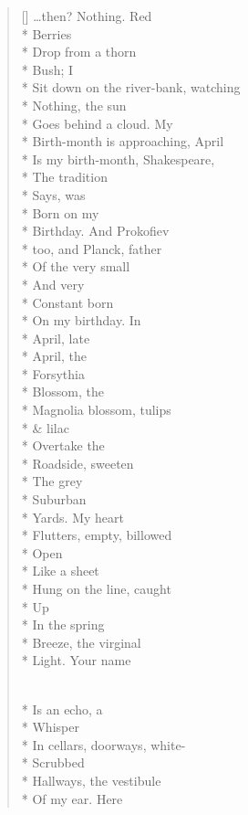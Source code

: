 \begin{verse}[\versewidth]
\ldots then? Nothing.     Red\\*
Berries\\*
Drop from a thorn\\*
Bush; I\\*
Sit down on the river-bank, watching\\*
Nothing, the sun\\*
Goes behind a cloud.  My\\*
Birth-month is approaching, April\\*
Is my birth-month, Shakespeare,\\*
The tradition\\*
Says, was\\*
Born on my\\*
Birthday.     And Prokofiev\\*
too, and Planck, father\\*
Of the very small\\*
And very\\*
Constant       born\\*
On my birthday. \qquad In\\*
April, late\\*
April, the\\*
Forsythia\\*
Blossom, the\\*
Magnolia blossom, tulips\\*
\& lilac \\*
Overtake the \\*
Roadside, sweeten\\*
The grey\\*
Suburban\\*
Yards.   My heart\\*
Flutters, empty, billowed\\*
Open\\*
Like a sheet\\*
Hung on the line, caught\\*
Up\\*
In the spring\\*
Breeze, the virginal\\*
Light.           Your name

\\*
Is an echo, a\\*
Whisper\\*
In cellars, doorways, white-\\*
Scrubbed\\*
Hallways, the vestibule\\*
Of my ear.   Here


\end{verse}
